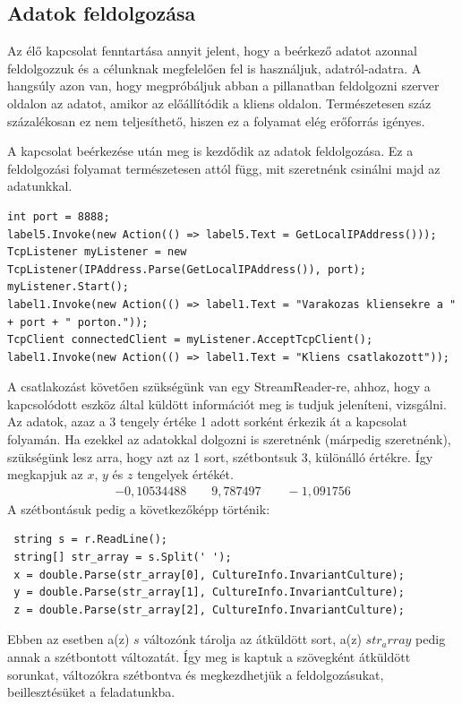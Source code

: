 \documentclass{thesis-ekf}
\theoremstyle{definition}
\theoremstyle{remark}
\begin{document}
\subsection{Adatok feldolgozása}
Az élő kapcsolat fenntartása annyit jelent, hogy a beérkező adatot azonnal feldolgozzuk és a célunknak megfelelően fel is használjuk, adatról-adatra. A hangsúly azon van, hogy megpróbáljuk abban a pillanatban feldolgozni szerver oldalon az adatot, amikor az előállítódik a kliens oldalon. Természetesen száz százalékosan ez nem teljesíthető, hiszen ez a folyamat elég erőforrás igényes.
\par A kapcsolat beérkezése után meg is kezdődik az adatok feldolgozása. Ez a feldolgozási folyamat természetesen attól függ, mit szeretnénk csinálni majd az adatunkkal.
\begin{lstlisting}
int port = 8888;
label5.Invoke(new Action(() => label5.Text = GetLocalIPAddress()));
TcpListener myListener = new TcpListener(IPAddress.Parse(GetLocalIPAddress()), port);
myListener.Start();
label1.Invoke(new Action(() => label1.Text = "Varakozas kliensekre a " + port + " porton."));
TcpClient connectedClient = myListener.AcceptTcpClient();
label1.Invoke(new Action(() => label1.Text = "Kliens csatlakozott"));
\end{lstlisting}
A csatlakozást követően szükségünk van egy StreamReader-re, ahhoz, hogy a kapcsolódott eszköz által küldött információt meg is tudjuk jeleníteni, vizsgálni.
Az adatok, azaz a 3 tengely értéke 1 adott sorként érkezik át a kapcsolat folyamán. Ha ezekkel az adatokkal dolgozni is szeretnénk (márpedig szeretnénk), szükségünk lesz arra, hogy azt az 1 sort, szétbontsuk 3, különálló értékre. Így megkapjuk az $x$, $y$ és $z$ tengelyek értékét.
\begin{align*}
-0,10534488 \qquad 9,787497 \qquad-1,091756
\end{align*}
 A szétbontásuk pedig a következőképp történik:
 \begin{lstlisting}
 string s = r.ReadLine();
 string[] str_array = s.Split(' ');
 x = double.Parse(str_array[0], CultureInfo.InvariantCulture);
 y = double.Parse(str_array[1], CultureInfo.InvariantCulture);
 z = double.Parse(str_array[2], CultureInfo.InvariantCulture);
 \end{lstlisting}
Ebben az esetben a(z) $s$ változónk tárolja az átküldött sort, a(z) $str_array$ pedig annak a szétbontott változatát. Így meg is kaptuk a szövegként átküldött sorunkat, változókra szétbontva és megkezdhetjük a feldolgozásukat, beillesztésüket a feladatunkba.
\end{document}
